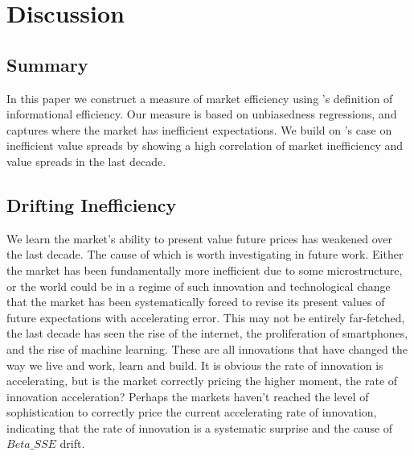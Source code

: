 \section{Discussion}
\label{sec:conclusion}
\subsection{Summary}
In this paper we construct a measure of market efficiency using \citet{fama_EMH}'s definition of informational efficiency. Our measure is based on unbiasedness
regressions, and captures where the market has inefficient expectations. We build on \citet{asness_2024}'s case on inefficient
value spreads by showing a high correlation of market inefficiency and value spreads in the last decade.

\subsection{Drifting Inefficiency}
We learn the market's ability to present value future prices has weakened over the last decade. The cause of which is worth investigating
in future work. Either the market has been fundamentally more inefficient due to some microstructure, or the world could be in a regime of such innovation and technological change that the market has been systematically forced to revise its
present values of future expectations with accelerating error. This may not be entirely far-fetched, the last decade has seen the rise of the internet,
the proliferation of smartphones, and the rise of machine learning. These are all innovations that have changed the way we live and work, learn and build.
It is obvious the rate of innovation is accelerating, but is the market correctly pricing the higher moment, the rate of innovation acceleration?
Perhaps the markets haven't reached the level of sophistication to correctly price the current accelerating rate of innovation, indicating that
the rate of innovation is a systematic surprise and the cause of $Beta\_SSE$ drift. 

